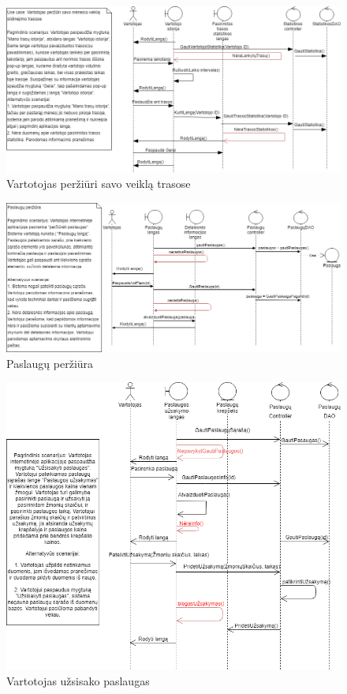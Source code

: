 \documentclass[oneside]{VUMIFPSkursinis}
\begin{document}
			\begin{figure}[h]
    				\centering
    				\includegraphics[width=1\textwidth]{seq2.png}
    				\caption{Vartotojas peržiūri savo veiklą trasose}
    				\label{fig:Vartotojas peržiūri savo veiklą trasose}
			\end{figure}


			\begin{figure}[h]
    				\centering
    				\includegraphics[width=1\textwidth]{seq4.png}
    				\caption{Paslaugų peržiūra}
    				\label{fig:Paslaugų peržiūra}
			\end{figure}

			\begin{figure}[h]
    				\centering
    				\includegraphics[width=1\textwidth]{seq6.png}
    				\caption{Vartotojas užsisako paslaugas}
    				\label{fig:Vartotojas užsisako paslaugas}
			\end{figure}
\end{document}

